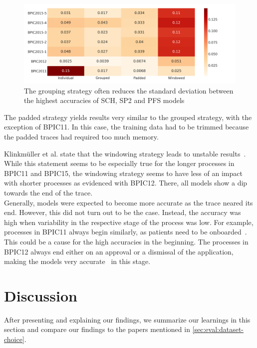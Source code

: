 \begin{figure}
    \centering
    \includegraphics[width=\textwidth]{gfx/grouping-accuracy-harmonization.png}
    \caption[Batching strategy harmonizes top accuracies]{The grouping strategy often reduces the standard deviation between the highest accuracies of SCH, SP2 and PFS models}
    \label{fig:grouping-accuracy-harmonization}
\end{figure}

The padded strategy yields results very similar to the grouped strategy, with the exception of BPIC11. In this case, the training data had to be trimmed because the padded traces had required too much memory.

Klinkmüller et al. state that the windowing strategy leads to unstable results~\cite{klinkmuller2018reliablemonitoring}. While this statement seems to be especially true for the longer processes in BPIC11 and BPIC15, the windowing strategy seems to have less of an impact with shorter processes as evidenced with BPIC12. There, all models show a dip towards the end of the trace.\\

Generally, models were expected to become more accurate as the trace neared its end. However, this did not turn out to be the case. Instead, the accuracy was high when variability in the respective stage of the process was low. For example, processes in BPIC11 always begin similarly, as patients need to be onboarded~\cite{bose2011analysis}. This could be a cause for the high accuracies in the beginning. The processes in BPIC12 always end either on an approval or a dismissal of the application, making the models very accurate~\cite{adriansyah2012mining} in this stage.

\section{Discussion}\label{sec:eval:discussion}
After presenting and explaining our findings, we summarize our learnings in this section and compare our findings to the papers mentioned in \autoref{sec:eval:dataset-choice}.\\

